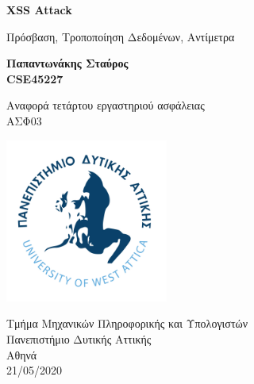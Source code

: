 %
%
%
\begin{titlepage}
	\begin{center}
		\vspace{1cm}	
		\Huge	
		\textbf{XSS Attack}
		
		\vspace{0.5cm}
		\large
		Πρόσβαση, Τροποποίηση Δεδομένων, Αντίμετρα
				
		\vspace{1.5cm}
		\textbf{Παπαντωνάκης Σταύρος\\ CSE45227}
		\vfill
		
		Αναφορά τετάρτου εργαστηριού ασφάλειας\\
		ΑΣΦ03
		\vspace{0.8cm}
		\begin{center}
			\includegraphics[width=0.4\textwidth]{image/logo.jpg}		
		\end{center}
		\normalsize
		Τμήμα Μηχανικών Πληροφορικής και Υπολογιστών\\
		Πανεπιστήμιο Δυτικής Αττικής\\
		Αθηνά\\
		21/05/2020\\	
	\end{center}
\end{titlepage}